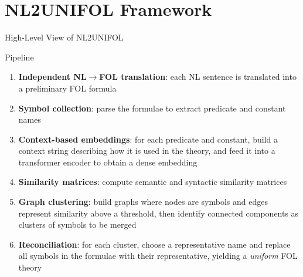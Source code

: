 \documentclass[presentation]{beamer}
\begin{document}
\section[Framework]{NL2UNIFOL Framework}

{
\usebackgroundtemplate{}

\begin{frame}[allowframebreaks]{High-Level View of NL2UNIFOL}


\begin{block}{Pipeline}
\begin{enumerate}
    \item \textbf{Independent NL$\rightarrow$FOL translation}: each NL sentence is translated into a preliminary FOL formula
    \item \textbf{Symbol collection}: parse the formulae to extract predicate and constant names
    \item \textbf{Context-based embeddings}: for each predicate and constant, build a context string describing how it is used in the theory, and feed it into a transformer encoder to obtain a dense embedding
    \item \textbf{Similarity matrices}: compute semantic and syntactic similarity matrices
    \item \textbf{Graph clustering}: build graphs where nodes are symbols and edges represent similarity above a threshold, then identify connected components as clusters of symbols to be merged
    \item \textbf{Reconciliation}: for each cluster, choose a representative name and replace all symbols in the formulae with their representative, yielding a \emph{uniform} FOL theory
\end{enumerate}
\end{block}


\end{frame}}
\end{document}
